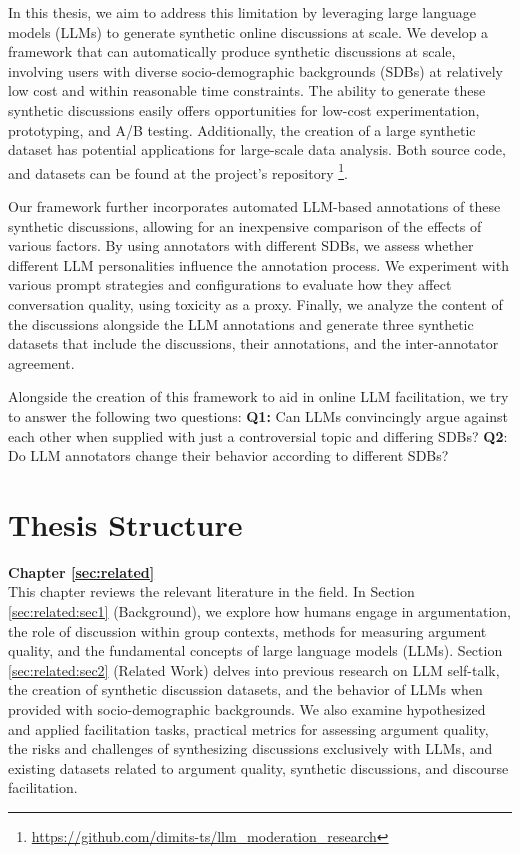 In this thesis, we aim to address this limitation by leveraging large language models (LLMs) to generate synthetic online discussions at scale. We develop a framework that can automatically produce synthetic discussions at scale, involving users with diverse socio-demographic backgrounds (SDBs) at relatively low cost and within reasonable time constraints. The ability to generate these synthetic discussions easily offers opportunities for low-cost experimentation, prototyping, and A/B testing. Additionally, the creation of a large synthetic dataset has potential applications for large-scale data analysis. Both source code, and datasets can be found at the project's repository \footnote{\url{https://github.com/dimits-ts/llm_moderation_research}}.

Our framework further incorporates automated LLM-based annotations of these synthetic discussions, allowing for an inexpensive comparison of the effects of various factors. By using annotators with different SDBs, we assess whether different LLM personalities influence the annotation process. We experiment with various prompt strategies and configurations to evaluate how they affect conversation quality, using toxicity as a proxy. Finally, we analyze the content of the discussions alongside the LLM annotations and generate three synthetic datasets that include the discussions, their annotations, and the inter-annotator agreement.

Alongside the creation of this framework to aid in online LLM facilitation, we try to answer the following two questions: \textbf{Q1:} Can LLMs convincingly argue against each other when supplied with just a controversial topic and differing SDBs? \textbf{Q2}: Do LLM annotators change their behavior according to different SDBs?

\section{Thesis Structure}
\label{sec:intro:structure}

\textbf{Chapter \ref{sec:related}} \\[0.2em]

This chapter reviews the relevant literature in the field. In Section \ref{sec:related:sec1} (Background), we explore how humans engage in argumentation, the role of discussion within group contexts, methods for measuring argument quality, and the fundamental concepts of large language models (LLMs). Section \ref{sec:related:sec2} (Related Work) delves into previous research on LLM self-talk, the creation of synthetic discussion datasets, and the behavior of LLMs when provided with socio-demographic backgrounds. We also examine hypothesized and applied facilitation tasks, practical metrics for assessing argument quality, the risks and challenges of synthesizing discussions exclusively with LLMs, and existing datasets related to argument quality, synthetic discussions, and discourse facilitation.



